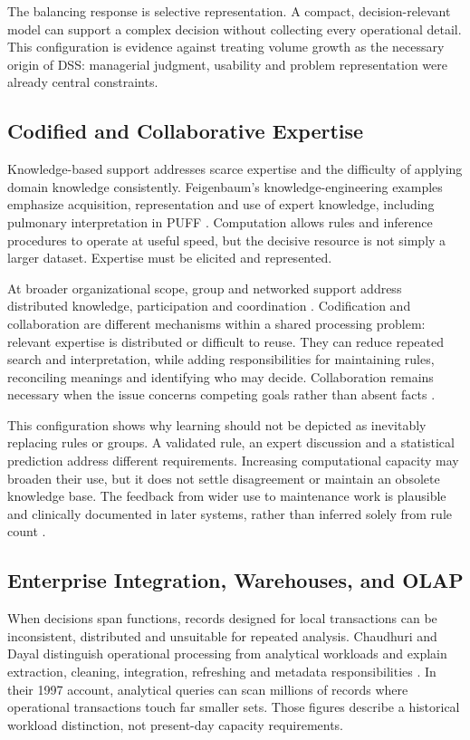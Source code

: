 \documentclass[journal]{IEEEtran}
\begin{document}
The balancing response is selective representation. A compact, decision-relevant model can support a complex decision without collecting every operational detail. This configuration is evidence against treating volume growth as the necessary origin of DSS: managerial judgment, usability and problem representation were already central constraints.

\subsection{Codified and Collaborative Expertise}
Knowledge-based support addresses scarce expertise and the difficulty of applying domain knowledge consistently. Feigenbaum's knowledge-engineering examples emphasize acquisition, representation and use of expert knowledge, including pulmonary interpretation in PUFF \cite{feigenbaum1977}. Computation allows rules and inference procedures to operate at useful speed, but the decisive resource is not simply a larger dataset. Expertise must be elicited and represented.

At broader organizational scope, group and networked support address distributed knowledge, participation and coordination \cite{shim2002}. Codification and collaboration are different mechanisms within a shared processing problem: relevant expertise is distributed or difficult to reuse. They can reduce repeated search and interpretation, while adding responsibilities for maintaining rules, reconciling meanings and identifying who may decide. Collaboration remains necessary when the issue concerns competing goals rather than absent facts \cite{DAFT1986}.

This configuration shows why learning should not be depicted as inevitably replacing rules or groups. A validated rule, an expert discussion and a statistical prediction address different requirements. Increasing computational capacity may broaden their use, but it does not settle disagreement or maintain an obsolete knowledge base. The feedback from wider use to maintenance work is plausible and clinically documented in later systems, rather than inferred solely from rule count \cite{Sutton2020}.

\subsection{Enterprise Integration, Warehouses, and OLAP}
When decisions span functions, records designed for local transactions can be inconsistent, distributed and unsuitable for repeated analysis. Chaudhuri and Dayal distinguish operational processing from analytical workloads and explain extraction, cleaning, integration, refreshing and metadata responsibilities \cite{chaudhuri1997}. In their 1997 account, analytical queries can scan millions of records where operational transactions touch far smaller sets. Those figures describe a historical workload distinction, not present-day capacity requirements.
\end{document}
